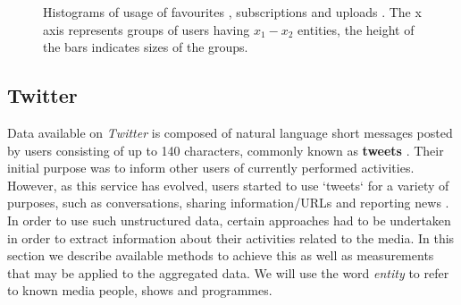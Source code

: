 \begin{figure}[ht]
  \centering
  \label{fig:subfigureExample}
  \caption{Histograms of usage of favourites , subscriptions
   and uploads . The x axis represents groups of
  users having $x_1-x_2$ entities, the height of the bars indicates sizes of the
  groups.}
\end{figure}

\newpage
\subsection{Twitter}

Data available on \textit{Twitter} is composed of natural language short messages posted by users
consisting of up to 140 characters, commonly known as \textbf{tweets} \cite{why-we-twitter}.
Their initial purpose was to inform other users of currently performed activities. However, as this service has
evolved, users started to use `tweets` for a variety of purposes, such as conversations,	sharing information/URLs and reporting news \cite{twitter-content-is-it}. In order to use such unstructured data,
certain approaches had to be undertaken in order to
extract information about their activities related to the media. In this section we describe
available methods to achieve this as well as measurements that may be applied to the aggregated data.
We will use the word \textit{entity} to refer to known media people, shows and programmes.

